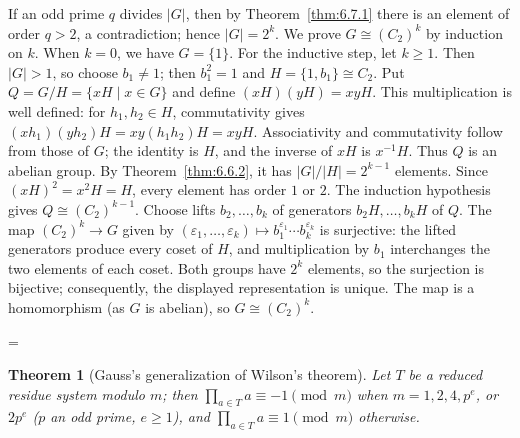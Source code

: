 \documentclass[11pt]{article}
\makeatletter
\theoremstyle{ntstyle}
\newtheorem{theorem}{Theorem}[subsection]
\let\nt@closedisplay\]
\def\nt@guardedclose{\@ifnextchar\par{\nt@closeafterpar}{\@ifnextchar\end{\postdisplaypenalty\@M\nt@closedisplay}{\nt@closedisplay}}}
\def\nt@closeafterpar\par{\@ifnextchar\par{\nt@closeafterpar}{\@ifnextchar\end{\postdisplaypenalty\@M\nt@closedisplay\par}{\nt@closedisplay\par}}}
\renewenvironment{proof}[1][\proofname]{\par
  \pushQED{\qed}\normalfont\topsep\medskipamount\edef\nt@afterproof{\@endparpenalty=\the\@endparpenalty\relax}\@beginparpenalty\@M\@endparpenalty\@M\let\]\nt@guardedclose\trivlist\item[]\textit{#1\@addpunct{.}} \ignorespaces}{\ifvmode\addpenalty\@M\fi\popQED\nt@afterproof\endtrivlist\@endpefalse}
\makeatother
\begin{document}
\begin{proof} If an odd prime $q$ divides $|G|$, then by
	Theorem~\ref{thm:6.7.1} there is an element of order $q > 2$, a contradiction;
	hence $|G| = 2^{k}$. We prove $G \cong (C_2)^{k}$ by induction on
	$k$. When $k = 0$, we have $G = \{1\}$. For the inductive step, let
	$k\ge1$. Then $|G|>1$, so choose $b_1\neq
		1$; then $b_1^2=1$ and $H = \{1, b_1\} \cong C_2$. Put
	$Q=G/H=\{xH\mid x\in G\}$ and define $(xH)(yH)=xyH$.
	This multiplication is well defined: for $h_1,h_2\in H$, commutativity gives
	$(xh_1)(yh_2)H=xy(h_1h_2)H=xyH$.
	Associativity and commutativity follow from those of $G$; the identity is
	$H$, and the inverse of $xH$ is $x^{-1}H$. Thus $Q$ is an abelian group.
	By Theorem~\ref{thm:6.6.2}, it has $|G|/|H|=2^{k-1}$ elements.
	Since $(xH)^2=x^2H=H$, every element has order $1$ or $2$.
	The induction hypothesis gives $Q\cong(C_2)^{k-1}$. Choose lifts $b_2,\ldots,b_k$ of generators $b_2H,\ldots,b_kH$ of $Q$. The map $(C_2)^k\to G$ given by $(\varepsilon_1,\ldots,\varepsilon_k)\mapsto b_1^{\varepsilon_1}\cdots b_k^{\varepsilon_k}$ is surjective: the lifted generators produce every coset of $H$, and multiplication by $b_1$ interchanges the two elements of each coset. Both groups have $2^k$ elements, so the surjection is bijective; consequently, the displayed representation is unique. The map is a homomorphism (as $G$ is
	abelian), so $G \cong (C_2)^{k}$.

\end{proof}
\begin{theorem}[Gauss's generalization of Wilson's theorem]\label{thm:6.7.3} Let $T$ be a reduced residue system modulo $m$; then
	$\prod_{a \in T} a \equiv -1 \pmod{m}$ when $m = 1, 2, 4, p^{e}$, or $2
		p^{e}$ ($p$ an odd prime, $e \ge 1$), and $\prod_{a \in T} a \equiv 1 \pmod{m}$ otherwise.

\end{theorem}
\end{document}
